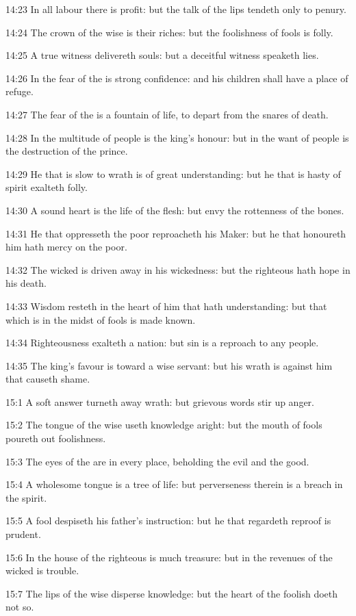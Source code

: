 14:23 In all labour there is profit: but the talk of the lips tendeth only to penury.

14:24 The crown of the wise is their riches: but the foolishness of fools is folly.

14:25 A true witness delivereth souls: but a deceitful witness speaketh lies.

14:26 In the fear of the \LORD is strong confidence: and his children shall have a place of refuge.

14:27 The fear of the \LORD is a fountain of life, to depart from the snares of death.

14:28 In the multitude of people is the king's honour: but in the want of people is the destruction of the prince.

14:29 He that is slow to wrath is of great understanding: but he that is hasty of spirit exalteth folly.

14:30 A sound heart is the life of the flesh: but envy the rottenness of the bones.

14:31 He that oppresseth the poor reproacheth his Maker: but he that honoureth him hath mercy on the poor.

14:32 The wicked is driven away in his wickedness: but the righteous hath hope in his death.

14:33 Wisdom resteth in the heart of him that hath understanding: but that which is in the midst of fools is made known.

14:34 Righteousness exalteth a nation: but sin is a reproach to any people.

14:35 The king's favour is toward a wise servant: but his wrath is against him that causeth shame.

15:1 A soft answer turneth away wrath: but grievous words stir up anger.

15:2 The tongue of the wise useth knowledge aright: but the mouth of fools poureth out foolishness.

15:3 The eyes of the \LORD are in every place, beholding the evil and the good.

15:4 A wholesome tongue is a tree of life: but perverseness therein is a breach in the spirit.

15:5 A fool despiseth his father's instruction: but he that regardeth reproof is prudent.

15:6 In the house of the righteous is much treasure: but in the revenues of the wicked is trouble.

15:7 The lips of the wise disperse knowledge: but the heart of the foolish doeth not so.

